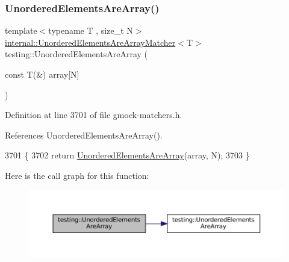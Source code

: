 \subsubsection{\texorpdfstring{Unordered\+Elements\+Are\+Array()}{UnorderedElementsAreArray()}\hspace{0.1cm}{\footnotesize\ttfamily [3/4]}}
{\footnotesize\ttfamily template$<$typename T , size\+\_\+t N$>$ \\
\hyperlink{classtesting_1_1internal_1_1UnorderedElementsAreArrayMatcher}{internal\+::\+Unordered\+Elements\+Are\+Array\+Matcher}$<$T$>$ testing\+::\+Unordered\+Elements\+Are\+Array (\begin{DoxyParamCaption}\item[{const T(\&)}]{array\mbox{[}\+N\mbox{]} }\end{DoxyParamCaption})\hspace{0.3cm}{\ttfamily [inline]}}



Definition at line 3701 of file gmock-\/matchers.\+h.



References Unordered\+Elements\+Are\+Array().


\begin{DoxyCode}
3701                                                \{
3702   \textcolor{keywordflow}{return} \hyperlink{namespacetesting_a72b0ee2217293106fcf4971dc4a59f4c}{UnorderedElementsAreArray}(array, N);
3703 \}
\end{DoxyCode}
Here is the call graph for this function\+:
\nopagebreak
\begin{figure}[H]
\begin{center}
\leavevmode
\includegraphics[width=350pt]{namespacetesting_a23c7729cfc61967f3271018076c4b724_cgraph}
\end{center}
\end{figure}
\mbox{\label{namespacetesting_a72b0ee2217293106fcf4971dc4a59f4c}} 
